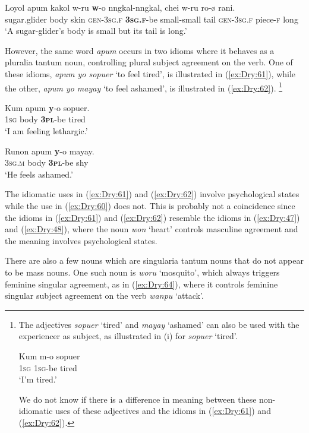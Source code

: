 \documentclass[output=collectionpaper]{langsci/langscibook}
\begin{document}
\ea \label{ex:Dry:60}
\gll Loyol	apum	kakol	w-ru	\textbf{w}-o nngkal-nngkal,	chei	w-ru	ro-ø	rani.\\
sugar.glider body skin \textsc{gen}-\textsc{3sg.f} \textbf{\textsc{3sg.f}}-be small-small tail \textsc{gen}-\textsc{3sg.f} piece-\textsc{f} long\\
\glt `A sugar-glider's body is small but its tail is long.'
\z

However, the same word \textit{apum} occurs in two idioms where it behaves as a pluralia tantum noun, controlling plural subject agreement on the verb. One of these idioms, \textit{apum yo sopuer} `to feel tired', is illustrated in (\ref{ex:Dry:61}), while the other, \textit{apum yo mayay} `to feel ashamed', is illustrated in (\ref{ex:Dry:62}).%
\footnote{The adjectives \textit{sopuer} `tired' and \textit{mayay} `ashamed' can also be used with the experiencer as subject, as illustrated in (i) for \textit{sopuer} `tired'.

\begin{exe}
{
\gll Kum	m-o	sopuer\\
\textsc{1sg} \textsc{1sg}-be tired\\
\glt `I'm tired.'
}
\end{exe}

\noindent We do not know if there is a difference in meaning between these non-idiomatic uses of these adjectives and the idioms in (\ref{ex:Dry:61}) and (\ref{ex:Dry:62}).}

\ea \label{ex:Dry:61}
\gll Kum	apum	\textbf{y}-o	sopuer.\\
\textsc{1sg} body \textbf{\textsc{3pl}}-be tired\\
\glt  `I am feeling lethargic.'
\z

\ea \label{ex:Dry:62}
\gll Runon	apum	\textbf{y}-o	mayay.\\
\textsc{3sg.m} body \textbf{\textsc{3pl}}-be shy\\
\glt  `He feels ashamed.'
\z

The idiomatic uses in (\ref{ex:Dry:61}) and (\ref{ex:Dry:62}) involve psychological states while the use in (\ref{ex:Dry:60}) does not. This is probably not a coincidence since the idioms in (\ref{ex:Dry:61}) and (\ref{ex:Dry:62}) resemble the idioms in (\ref{ex:Dry:47}) and (\ref{ex:Dry:48}), where the noun \textit{won} `heart' controls masculine agreement and the meaning involves psychological states.

There are also a few nouns which are singularia tantum nouns that do not appear to be mass nouns. One such noun is \textit{woru} `mosquito', which always triggers feminine singular agreement, as in (\ref{ex:Dry:64}), where it controls feminine singular subject agreement on the verb \textit{wanpu} `attack'.
\end{document}
